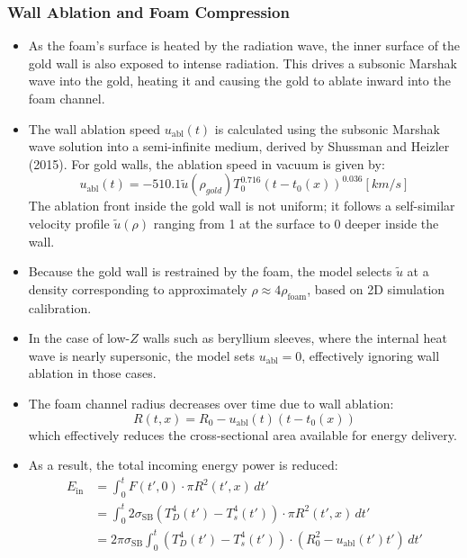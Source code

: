 \documentclass{article}
\begin{document}
\subsubsection*{Wall Ablation and Foam Compression}

\begin{itemize}
    \item As the foam's surface is heated by the radiation wave, the inner surface of the gold wall is also exposed to intense radiation. This drives a subsonic Marshak wave into the gold, heating it and causing the gold to ablate inward into the foam channel.

    \item The wall ablation speed $u_{\text{abl}}(t)$ is calculated using the subsonic Marshak wave solution into a semi-infinite medium, derived by Shussman and Heizler (2015). For gold walls, the ablation speed in vacuum is given by:
    \begin{equation}
    u_{\text{abl}}(t) = -510.1 \tilde u(\rho_{gold}) T_0^{0.716} (t-t_0(x))^{0.036} [km/s]
    \end{equation}
    The ablation front inside the gold wall is not uniform; it follows a self-similar velocity profile $\tilde{u}(\rho)$ ranging from 1 at the surface to 0 deeper inside the wall.
        
    \item Because the gold wall is restrained by the foam, the model selects $\tilde{u}$ at a density corresponding to approximately $\rho \approx 4\rho_{\text{foam}}$, based on 2D simulation calibration.
    
    \item In the case of low-$Z$ walls such as beryllium sleeves, where the internal heat wave is nearly supersonic, the model sets $u_{\text{abl}} = 0$, effectively ignoring wall ablation in those cases.

    \item The foam channel radius decreases over time due to wall ablation:
    \[
    R(t,x) = R_0 - u_{\text{abl}}(t) (t-t_0(x))
    \]
    which effectively reduces the cross-sectional area available for energy delivery.

    \item As a result, the total incoming energy power is reduced:
    \begin{equation}
    \begin{aligned}
        E_{\text{in}} &= \int_0^{t} F(t',0) \cdot \pi R^2(t',x) \, dt' \\
        &= \int_0^{t} 2\sigma_{\text{SB}} \left(T_D^{4}(t') - T_s^4(t')\right) \cdot \pi R^2(t',x) \, dt' \\
        &= 2\pi \sigma_{\text{SB}} \int_0^{t} \left(T_D^{4}(t') - T_s^4(t')\right) \cdot \left(R_0^2 - u_{\text{abl}}(t') t'\right) \, dt'
    \end{aligned}
    \end{equation}


\end{itemize}
\end{document}
